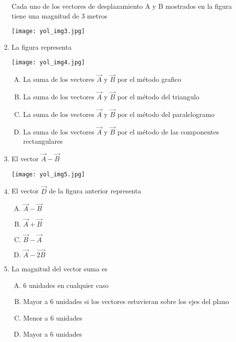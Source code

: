 \begin{enumerate}
\noindent Cada uno de los vectores de desplazamiento A y B mostrados en la figura tiene una magnitud de 3 metros

\begin{center}
\texttt{[image: yol\_img3.jpg]}
\end{center}
\item  La figura representa \label{yolf-9}\\

\begin{center}
\texttt{[image: yol\_img4.jpg]}
\end{center}

\begin{enumerate}[(A)]
\item  La suma de los vectores $\vec{A}$  y $\vec{B}$ por el método grafico
\item  La suma de los vectores $\vec{A}$  y $\vec{B}$ por el método del triangulo
\item  La suma de los vectores $\vec{A}$  y $\vec{B}$ por el método del paralelogramo
\item  La suma de los vectores $\vec{A}$  y $\vec{B}$ por el método de las componentes rectangulares
\end{enumerate}

\newpage
\item El vector $\vec{A}-\vec{B}$ \label{yolf-10}
\begin{center}
\texttt{[image: yol\_img5.jpg]}
\end{center}

\item El vector $\vec{D}$ de la figura anterior representa \label{yolf-11}\\

\begin{enumerate}[(A)]
\item  $\vec{A}-\vec{B}$
\item  $\vec{A}+\vec{B}$
\item  $\vec{B}-\vec{A}$
\item  $\vec{A}-\vec{2B}$
\end{enumerate}

\item La magnitud del vector suma es  \label{yolf-12}\\

\begin{enumerate}[(A)]
\item  6 unidades en cualquier caso
\item  Mayor a 6 unidades si los vectores estuvieran sobre los ejes del plano
\item  Menor a 6 unidades
\item  Mayor a 6 unidades
\end{enumerate}


\end{enumerate}

